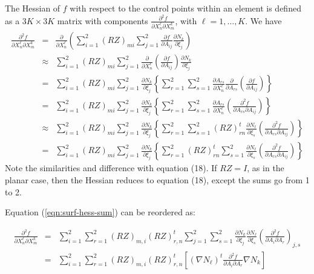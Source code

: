  \newline
The Hessian of $f$ with respect to the control points within an element is 
defined as a $3K \times 3K$ matrix with components $\frac{\partial^2 f}{\partial X_n^\ell \partial X_m^k}$, with $\ell=1,\ldots,K$.  We have
\begin{eqnarray}
\frac{\partial^2 f}{\partial X_n^\ell \partial X_m^k} & = & \frac{\partial}{\partial X_n^\ell} \left( \sum_{i=1}^2  \left( RZ \right)_{mi} \sum_{j=1}^2 \frac{\partial f}{\partial A_{ij}} \frac{\partial N_k}{\partial \xi_j} \right) \nonumber \\
& \approx &\sum_{i=1}^2 \left( RZ \right)_{mi} \sum_{j=1}^2  \frac{\partial}{\partial X_n^\ell}  \left( \frac{\partial f}{\partial A_{ij}} \right) \frac{\partial N_k}{\partial \xi_j} \nonumber \\
& = & \sum_{i=1}^2  \left( RZ \right)_{mi} \sum_{j=1}^2  \frac{\partial N_k}{\partial \xi_j} \left\{ \sum_{r=1}^2 \sum_{s=1}^2 \frac{\partial A_{rs}}{\partial X_{n}^\ell} \frac{\partial}{\partial A_{rs}}  \left(  \frac{\partial f}{\partial A_{ij}}  \right) \right\}  \nonumber \\
& = & \sum_{i=1}^2  \left( RZ \right)_{mi} \sum_{j=1}^2  \frac{\partial N_k}{\partial \xi_j} \left\{ \sum_{r=1}^2 \sum_{s=1}^2 \frac{\partial A_{rs}}{\partial X_{n}^\ell} \left(  \frac{\partial^2 f}{\partial A_{rs} \partial A_{ij}}  \right) \right\}  \nonumber \\
& \approx & \sum_{i=1}^2  \left( RZ \right)_{mi} \sum_{j=1}^2 \frac{\partial N_k}{\partial \xi_j} \left\{ \sum_{r=1}^2 \sum_{s=1}^2 \left( RZ \right)_{rn}^t \frac{\partial N_\ell}{\partial \xi_s} \left( \frac{\partial^2 f}{\partial A_{rs} \partial A_{ij}}  \right)  \right\}  \nonumber \\
& = & \label{eqn:surf-hess-sum} \sum_{i=1}^2  \left( RZ \right)_{mi} \sum_{j=1}^2 \frac{\partial N_k}{\partial \xi_j} \left\{ \sum_{r=1}^2  \left( RZ \right)_{rn}^t \sum_{s=1}^2 \frac{\partial N_\ell}{\partial \xi_s} \left( \frac{\partial^2 f}{\partial A_{rs} \partial A_{ij}}  \right)  \right\} 
\end{eqnarray}
Note the similarities and difference with equation (18). If 
$RZ = I$, as in the planar case, then the Hessian reduces to equation (18),
except the sums go from 1 to 2.\newline

\noindent Equation (\ref{eqn:surf-hess-sum}) can be reordered as:

\begin{eqnarray}
\frac{\partial^2 f}{\partial X_n^\ell \partial X_m^k} 
&=& \sum_{i=1}^2 \sum_{r=1}^2 (RZ)_{m,i} (RZ)^t_{r,n}
    \sum_{j=1}^2 \sum_{s=1}^2 \frac{\partial N_k}{\partial \xi_j}
    \frac{\partial N_\ell}{\partial \xi_s}
    \left( \frac{\partial^2 f}{\partial A_i \partial A_r} \right)_{j,s} 
    \nonumber \\
&=& \label{eqn:surf-hess-summat} 
    \sum_{i=1}^2 \sum_{r=1}^2 (RZ)_{m,i} (RZ)^t_{r,n} 
    \left[ (\nabla N_\ell)^t \frac{\partial^2 f}{\partial A_i \partial A_r}
            \nabla N_k \right] 
\end{eqnarray}

